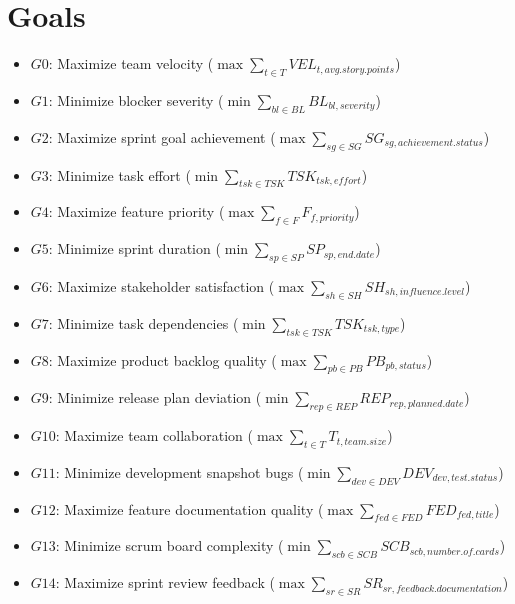 \documentclass{article}
\begin{document}
\section{Goals}
\begin{itemize}
    \item $G0$: Maximize team velocity ($\max \sum_{t \in T} VEL_{t,avg.story.points}$)
    \item $G1$: Minimize blocker severity ($\min \sum_{bl \in BL} BL_{bl,severity}$)
    \item $G2$: Maximize sprint goal achievement ($\max \sum_{sg \in SG} SG_{sg,achievement.status}$)
    \item $G3$: Minimize task effort ($\min \sum_{tsk \in TSK} TSK_{tsk,effort}$)
    \item $G4$: Maximize feature priority ($\max \sum_{f \in F} F_{f,priority}$)
    \item $G5$: Minimize sprint duration ($\min \sum_{sp \in SP} SP_{sp,end.date}$)
    \item $G6$: Maximize stakeholder satisfaction ($\max \sum_{sh \in SH} SH_{sh,influence.level}$)
    \item $G7$: Minimize task dependencies ($\min \sum_{tsk \in TSK} TSK_{tsk,type}$)
    \item $G8$: Maximize product backlog quality ($\max \sum_{pb \in PB} PB_{pb,status}$)
    \item $G9$: Minimize release plan deviation ($\min \sum_{rep \in REP} REP_{rep,planned.date}$)
    \item $G10$: Maximize team collaboration ($\max \sum_{t \in T} T_{t,team.size}$)
    \item $G11$: Minimize development snapshot bugs ($\min \sum_{dev \in DEV} DEV_{dev,test.status}$)
    \item $G12$: Maximize feature documentation quality ($\max \sum_{fed \in FED} FED_{fed,title}$)
    \item $G13$: Minimize scrum board complexity ($\min \sum_{scb \in SCB} SCB_{scb,number.of.cards}$)
    \item $G14$: Maximize sprint review feedback ($\max \sum_{sr \in SR} SR_{sr,feedback.documentation}$)
\end{itemize}
\end{document}
